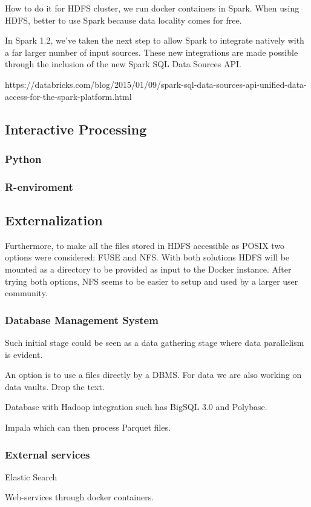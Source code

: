 How to do it for HDFS cluster, we run docker containers in Spark.
When using HDFS, better to use Spark because data locality comes for free.

In Spark 1.2, we’ve taken the next step to allow Spark to integrate natively with a far larger number
of input sources.  These new integrations are made possible through the inclusion of the new Spark SQL
Data Sources API.

https://databricks.com/blog/2015/01/09/spark-sql-data-sources-api-unified-data-access-for-the-spark-platform.html


\subsection{Interactive Processing}

\subsubsection{Python}

\subsubsection{R-enviroment}

\subsection{Externalization}
Furthermore, to make all the files stored in HDFS accessible as POSIX two options were considered: FUSE
and NFS. With both solutions HDFS will be mounted as a directory to be provided as input to the Docker
instance. After trying both options, NFS seems to be easier to setup and used by a larger user community.

\subsubsection{Database Management System}

Such initial stage could be seen as a data gathering stage where data parallelism is evident.

An option is to use a files directly by a DBMS.
For data we are also working on data vaults\cite{ivanova13}.
Drop the text.

Database with Hadoop integration such has BigSQL 3.0 and Polybase.

Impala which can then process Parquet files.


\subsubsection{External services}
Elastic Search

Web-services through docker containers.



